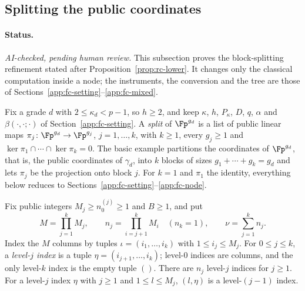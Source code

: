 
\subsection{Splitting the public coordinates}
\label{app:fc-split}

\paragraph{Status.} \emph{AI-checked, pending human review.} This subsection proves the block-splitting refinement stated after Proposition~\ref{prop:rc-lower}. It changes only the classical computation inside a node; the instruments, the conversion and the tree are those of Sections~\ref{app:fc-setting}--\ref{app:fc-mixed}.

Fix a grade $d$ with $2 \le \kappa_d < p-1$, so $h \ge 2$, and keep $\kappa$, $h$, $P_\kappa$, $D$, $q$, $\alpha$ and $\beta(\cdot,\cdot;\cdot)$ of Section~\ref{app:fc-setting}. A \emph{split} of $\Fp^{g_d}$ is a list of public linear maps $\pi_j \colon \Fp^{g_d} \to \Fp^{g_j}$, $j = 1,\dots,k$, with $k \ge 1$, every $g_j \ge 1$ and $\ker\pi_1 \cap \cdots \cap \ker\pi_k = 0$. The basic example partitions the coordinates of $\Fp^{g_d}$, that is, the public coordinates of $\gamma_d$, into $k$ blocks of sizes $g_1 + \cdots + g_k = g_d$ and lets $\pi_j$ be the projection onto block $j$. For $k = 1$ and $\pi_1$ the identity, everything below reduces to Sections~\ref{app:fc-setting}--\ref{app:fc-node}.

Fix public integers $M_j \ge n_0^{(j)} \ge 1$ and $B \ge 1$, and put
\[
  M = \prod_{j=1}^k M_j, \qquad n_j = \prod_{i=j+1}^{k} M_i \quad (n_k = 1), \qquad \nu = \sum_{j=1}^k n_j .
\]
Index the $M$ columns by tuples $\iota = (i_1,\dots,i_k)$ with $1 \le i_j \le M_j$. For $0 \le j \le k$, a \emph{level-$j$ index} is a tuple $\eta = (i_{j+1},\dots,i_k)$; level-$0$ indices are columns, and the only level-$k$ index is the empty tuple $()$. There are $n_j$ level-$j$ indices for $j \ge 1$. For a level-$j$ index $\eta$ with $j \ge 1$ and $1 \le l \le M_j$, $(l,\eta)$ is a level-$(j-1)$ index.

